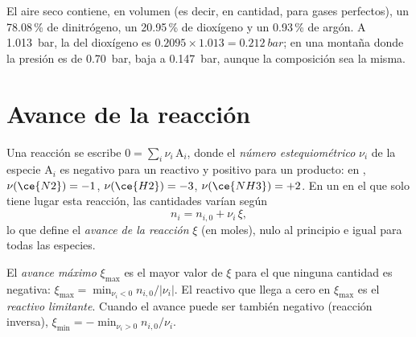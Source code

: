 \begin{example}[El aire]\label{ex:b1:extent-q-and-k:air}
El aire seco contiene, en volumen (es decir, en cantidad, para gases
perfectos), un 78.08\,\% de dinitrógeno, un 20.95\,\% de dioxígeno y un
0.93\,\% de argón. A \qty{1.013}{bar}, la  del dioxígeno es
$0.2095 \times
1.013 = \qty{0.212}{bar}$; en una montaña donde la presión es de
\qty{0.70}{bar}, baja a \qty{0.147}{bar}, aunque la composición sea la
misma.
\end{example}

\section{Avance de la reacción}

\begin{definition}\label{def:b1:extent-q-and-k:extent}
Una reacción se escribe $0 = \sum_i \nu_i\,\mathrm{A}_i$, donde el
\emph{número estequiométrico} $\nu_i$ de
la especie $\mathrm{A}_i$ es negativo para un reactivo y positivo para un
producto: en , $\nu(\ce{N2}) = -1$, $\nu(\ce{H2}) = -3$,
$\nu(\ce{NH3}) = +2$. En un  en el que solo tiene lugar
esta reacción, las cantidades varían según
\[
  n_i = n_{i,0} + \nu_i\,\xi ,
\]
lo que define el \emph{avance de la reacción}
$\xi$ (en moles), nulo al principio e igual para todas las especies.
\end{definition}

\begin{definition}\label{def:b1:extent-q-and-k:max-extent}
El \emph{avance máximo} $\xi_{\max}$ es el mayor valor
de $\xi$ para el que ninguna cantidad es negativa: $\xi_{\max} = \min_{\nu_i <
0} n_{i,0}/|\nu_i|$. El reactivo que llega a cero en $\xi_{\max}$ es el
\emph{reactivo limitante}. Cuando el avance puede
ser también negativo (reacción inversa), $\xi_{\min} = -\min_{\nu_i > 0}
n_{i,0}/\nu_i$.
\end{definition}

